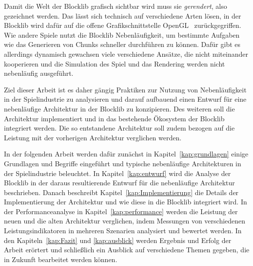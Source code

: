 Damit die Welt der Blocklib grafisch sichtbar wird muss sie \emph{gerendert}, also gezeichnet werden. Das lässt sich technisch auf verschiedene Arten lösen, in der Blocklib wird dafür auf die offene Grafikschnittstelle OpenGL~\cite{TheKhronosGroup,Vries2020} zurückgegriffen. Wie andere Spiele nutzt die Blocklib Nebenläufigkeit, um bestimmte Aufgaben wie das Generieren von Chunks schneller durchführen zu können. Dafür gibt es allerdings dynamisch gewachsen viele verschiedene Ansätze, die nicht miteinander kooperieren und die Simulation des Spiel und das Rendering werden nicht nebenläufig ausgeführt.

Ziel dieser Arbeit ist es daher gängig Praktiken zur Nutzung von Nebenläufigkeit in der Spielindustrie zu analysieren und darauf aufbauend einen Entwurf für eine nebenläufige Architektur in der Blocklib zu konzipieren. Des weiteren soll die Architektur implementiert und in das bestehende Ökosystem der Blocklib integriert werden. Die so entstandene Architektur soll zudem bezogen auf die Leistung mit der vorherigen Architektur verglichen werden.

In der folgenden Arbeit werden dafür zunächst in Kapitel~\ref{kap:grundlagen} einige Grundlagen und Begriffe eingeführt und typische nebenläufige Architekturen in der Spielindustrie beleuchtet. In Kapitel~\ref{kap:entwurf} wird die Analyse der Blocklib in der daraus resultierende Entwurf für die nebenläufige Architektur beschrieben. Danach beschreibt Kapitel~\ref{kap:Implementierung} die Details der Implementierung der Architektur und wie diese in die Blocklib integriert wird. In der Performanceanalyse in Kapitel~\ref{kap:performance} werden die Leistung der neuen und die alten Architektur verglichen, indem Messungen von verschiedenen Leistungsindikatoren in mehreren Szenarien analysiert und bewertet werden. In den Kapiteln~\ref{kap:Fazit} und \ref{kap:ausblick} werden Ergebnis und Erfolg der Arbeit erörtert und schließlich ein Ausblick auf verschiedene Themen gegeben, die in Zukunft bearbeitet werden können.